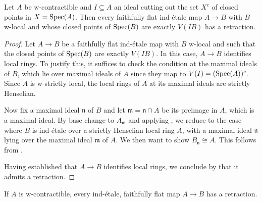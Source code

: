 \begin{lemma}
    \label{thm:ind-etale-plus-c-has-retraction-if}
    Let $A$ be w-contractible and $I \subseteq A$ an ideal cutting out the set $X^c$ of closed points in $X = \mathrm{Spec}(A)$.
    Then every faithfully flat ind-étale map \(A \to B\) with \(B\) w-local and
    whose closed points of \(\operatorname{Spec} (B)\) are exactly \(V(IB)\) has a retraction.
\end{lemma}

\begin{proof}
  Let \(A \to B\) be a faithfully flat ind-étale map with \(B\) w-local and such that the closed points of \(\operatorname{Spec}(B)\) are exactly \(V(IB)\). In this case, \(A \to B\) identifies local rings. To justify this, it suffices to check the condition at the maximal ideals of \(B\), which lie over maximal ideals of \(A\) since they map to \(V(I) = (\operatorname{Spec}(A))^c\). Since \(A\) is w-strictly local, the local rings of \(A\) at its maximal ideals are strictly Henselian.

  Now fix a maximal ideal \(\mathfrak{n}\) of \(B\) and let \(\mathfrak{m} = \mathfrak{n} \cap A\) be its preimage in \(A\), which is a maximal ideal. By base change to \(A_{\mathfrak{m}}\) and applying , we reduce to the case where \(B\) is ind-étale over a strictly Henselian local ring \(A\), with a maximal ideal \(\mathfrak{n}\) lying over the maximal ideal \(\mathfrak{m}\) of \(A\). We then want to show \(B_{\mathfrak{n}} \cong A\). This follows from .

  Having established that \(A \to B\) identifies local rings, we conclude by  that it admits a retraction.
\end{proof}

\begin{proposition} %
  \label{thm:w-contractible-retraction}
  If $A$ is w-contractible, every ind-étale, faithfully flat map $A \to B$ has a retraction.
  \leanok
\end{proposition}

